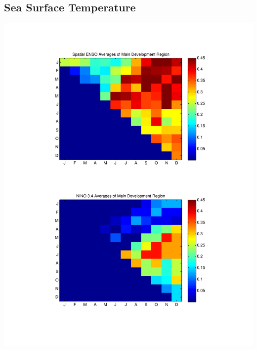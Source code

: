 \documentclass[11pt]{article}
\begin{document}
\subsection{Sea Surface Temperature}
\includegraphics[scale=0.69]{images/varyingMonthsForMDRAveragesSST.pdf}
\end{document}
